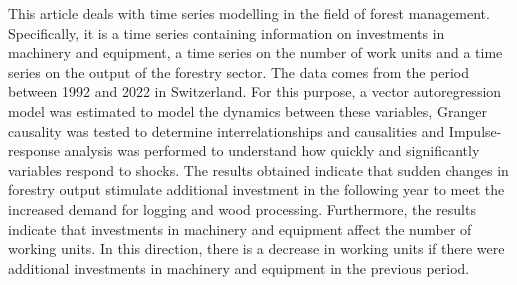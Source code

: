 
\begin{Abstrakt}
    This article deals with time series modelling in the field of forest management. Specifically, it is a time series containing information on investments in machinery and equipment, a time series on the number of work units and a time series on the output of the forestry sector. The data comes from the period between 1992 and 2022 in Switzerland. For this purpose, a vector autoregression model was estimated to model the dynamics between these variables, Granger causality was tested to determine interrelationships and causalities and Impulse-response analysis was performed to understand how quickly and significantly variables respond to shocks. The results obtained indicate that sudden changes in forestry output stimulate additional investment in the following year to meet the increased demand for logging and wood processing. Furthermore, the results indicate that investments in machinery and equipment affect the number of working units. In this direction, there is a decrease in working units if there were additional investments in machinery and equipment in the previous period.
\end{Abstrakt}



\clearpage